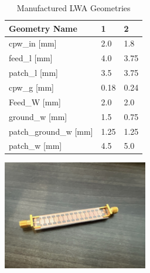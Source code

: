\documentclass[conference]{IEEEtran}
\newenvironment{Figure}
    {\par\medskip\noindent\minipage{\linewidth}}
    {\endminipage\par\medskip}
\begin{document}
\begin{table}[h]
\caption{Manufactured LWA Geometries}
\begin{center}
\begin{tabular}{ 
|l|l|l|}
    \hline
    Geometry Name & 1 & 2 \\
    \hline
    cpw\_in [mm] & 2.0 & 1.8 \\
    \hline
    feed\_l [mm] & 4.0 & 3.75 \\
    \hline
    patch\_l [mm] & 3.5 & 3.75 \\
    \hline
    cpw\_g [mm] & 0.18 & 0.24 \\
    \hline
    Feed\_W [mm] & 2.0 & 2.0 \\
    \hline
    ground\_w [mm] & 1.5 & 0.75 \\
    \hline
    patch\_ground\_w [mm] & 1.25 & 1.25 \\
    \hline
    patch\_w [mm] & 4.5 & 5.0 \\
    \hline
\end{tabular}
\end{center}
\label{manufactured_geometries_list}
\end{table}

\begin{Figure}
    \centering
    \includegraphics[width=2.5in]{manufactured_antenna}
    \label{manufactured_antenna_pic}
\end{Figure} 
\end{document}
